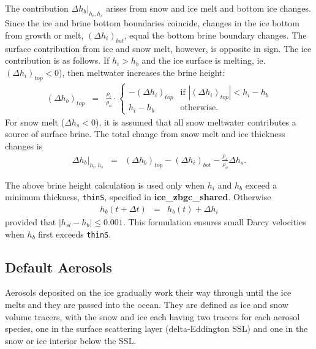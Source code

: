 The contribution $\Delta h_b|_{h_i,h_s}$ arises from snow and ice
melt and bottom ice changes.  Since the ice and brine bottom
boundaries coincide, changes in the ice bottom from growth or melt,
$(\Delta h_i)_{bot}$, equal the bottom brine boundary changes.  The surface
contribution from ice and snow melt, however, is opposite in
sign. The ice contribution is as follows. If $h_i > h_b$ and the ice
surface is melting, ie. $(\Delta h_i)_{top} <
0$), then meltwater increases the brine height:
\begin{eqnarray}
\left(\Delta h_b\right)_{top} & = &  \frac{\rho_i}{\rho_o} \cdot \left\{ \begin{array}{ll}
 -(\Delta h_i)_{top} &  \mbox{if }
 |(\Delta h_i)_{top}| < h_i-h_b  \\
 h_i-h_b & \mbox{otherwise.}   \end{array} \right.  
\end{eqnarray}
For snow melt ($\Delta h_s < 0$), it is assumed that
all snow meltwater contributes a source of surface
brine. The total change from snow melt and ice thickness changes is
\begin{eqnarray}
\label{eqn:dzdt_meltwater}
\Delta h_b|_{h_i,h_s} & = & \left( \Delta
h_b\right)_{top} -\left(\Delta h_i\right)_{bot} -\frac{\rho_s}{\rho_o}\Delta h_s.  
\end{eqnarray}

The above brine height calculation is used only when $h_i$ and $h_b$
exceed a minimum thickness, {\tt thinS}, specified in {\bf
  ice\_zbgc\_shared}. Otherwise 
\begin{eqnarray}
\label{eqn:thinbrine}
h_b(t+\Delta t) & = & h_b(t) + \Delta h_i 
\end{eqnarray}
provided that $|h_{sl}-h_b| \leq 0.001$.  This
formulation ensures small Darcy velocities
 when $h_b$ first exceeds {\tt thinS}.  

\subsection{Default Aerosols}

Aerosols deposited on the ice gradually
work their way through until the ice melts and they are passed
into the ocean.   They are defined as ice and snow volume tracers, with the
snow and ice each having two  tracers for each aerosol species, one in
the surface scattering layer (delta-Eddington SSL) and one in the snow or ice interior below the SSL.  

